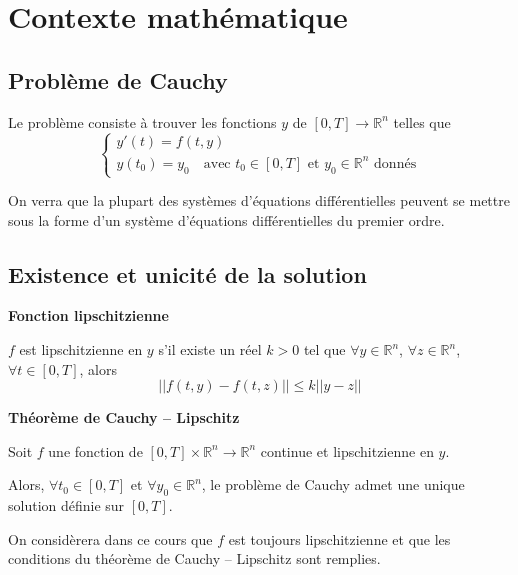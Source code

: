 \documentclass[10pt]{article}
\begin{document}
\section{Contexte mathématique}
\subsection{Problème de Cauchy}

\begin{prob}
Le problème consiste à trouver les fonctions $y$ de $[0,T]\rightarrow \mathbb{R}^n$ telles que
$$
\left\{
\begin{array}{l}
y'(t)=f(t,y) \\
y(t_0)=y_0 \quad \text{avec } t_0\in [0,T] \text{ et } y_0\in \mathbb{R}^n \text{ donnés}
\end{array}
\right.
 $$ 
\end{prob}

 
On verra que la plupart des systèmes d'équations différentielles peuvent se mettre sous la forme d'un système d'équations différentielles du premier ordre. 



\subsection{Existence et unicité de la solution}

\begin{defi}
\textbf{Fonction lipschitzienne}

$f$ est lipschitzienne en $y$ s'il existe un réel $k>0$ tel que $\forall y\in\mathbb{R}^n$, $\forall z\in\mathbb{R}^n$, $\forall t\in[0,T]$, alors 
$$
||f(t,y)-f(t,z)||\leq k||y-z||
$$

\end{defi}

\begin{theo}
\textbf{Théorème de Cauchy -- Lipschitz}

Soit $f$ une fonction de $[0,T] \times \mathbb{R}^n \rightarrow \mathbb{R}^n$ continue et lipschitzienne en $y$. 

Alors, $\forall t_0 \in [0,T]$ et $\forall y_0 \in \mathbb{R}^n$, le problème de Cauchy admet une unique solution définie sur $[0,T]$.

\end{theo}

On considèrera dans ce cours que $f$ est toujours lipschitzienne et que les conditions du théorème de Cauchy -- Lipschitz sont remplies. 
\end{document}
